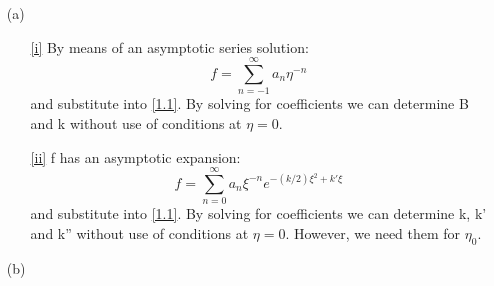 \documentclass[a4paper,11pt]{article}
\begin{document}
    \begin{enumerate}
       \item[(a)]   
           \begin{enumerate}      
           \item[\ref{i}] 
        By means of an asymptotic series solution: 
       $$ f = \sum_{n = -1}^{\infty} a_{n} \eta^{-n}$$ 
       and substitute into \ref{1.1}. By solving for coefficients we can determine B and k without use of conditions at $\eta = 0$. 
           \item[\ref{ii}] 
       f has an asymptotic expansion:
       $$ f = \sum_{n = 0}^{\infty} a_{n} \xi^{-n}e^{-(k/2)\xi^2+k'\xi}$$ 
       and substitute into \ref{1.1}. By solving for coefficients we can determine k, k' and k'' without use of conditions at $\eta = 0$. However, we need them for $\eta_{0}$.
         \end{enumerate}
        \item[(b)]


\end{enumerate}
\end{document}
